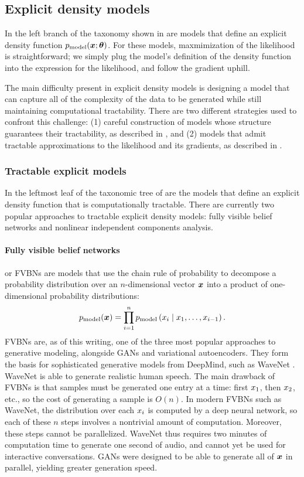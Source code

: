 \subsection{Explicit density models}

In the left branch of the taxonomy shown in  are models that define
an explicit density function $p_{\rm{model}}({\bm{x}} ; {\bm{\theta}})$.
For these models, maxmimization of the likelihood is straightforward; we simply plug
the model's definition of the density function into the expression for the likelihood,
and follow the gradient uphill.

The main difficulty present in explicit density models is designing a model that can
capture all of the complexity of the data to be generated 
while still maintaining computational tractability.
There are two different strategies used to confront this challenge:
(1) careful construction of models whose structure guarantees their tractability,
as described in ,
and (2) models that admit tractable approximations to the likelihood and its
gradients, as described in .

\subsubsection{Tractable explicit models}
\label{sec:explicit_tractable}

In the leftmost leaf of the taxonomic tree of  are the models
that define an explicit density function that is computationally tractable.
There are currently two popular approaches to tractable explicit density models:
fully visible belief networks and nonlinear independent components analysis.

\paragraph{Fully visible belief networks}
 \citep{Frey96,Frey98} or FVBNs are models that use the chain
rule of probability to decompose a probability distribution over an $n$-dimensional vector ${\bm{x}}$
into a product of one-dimensional probability distributions:
\[
p_{\rm{model}}({\bm{x}}) = \prod_{i=1}^n p_{\rm{model}}\left({x}_i \mid {x}_1, \dots, {x}_{i-1} \right).
\]
FVBNs are, as of this writing, one of the three most popular
approaches to generative modeling, alongside GANs and variational autoencoders.
They form the basis for sophisticated generative models from DeepMind, such as
WaveNet \citep{aaron-wavenet-2016}. WaveNet is able to generate realistic human speech.
The main drawback of FVBNs is that samples must be generated
one entry at a time: first ${x}_1$, then ${x}_2$, etc., so the cost of generating
a sample is $O(n)$.
In modern FVBNs such as WaveNet, the distribution over each ${x}_i$ is computed by a deep
neural network, so each of these $n$ steps involves a nontrivial amount of computation.
Moreover, these steps cannot be parallelized.
WaveNet thus requires two minutes of computation time to generate one second of audio,
and cannot yet be used for interactive conversations.
GANs were designed to be able to generate all of ${\bm{x}}$ in parallel, yielding greater
generation speed.

